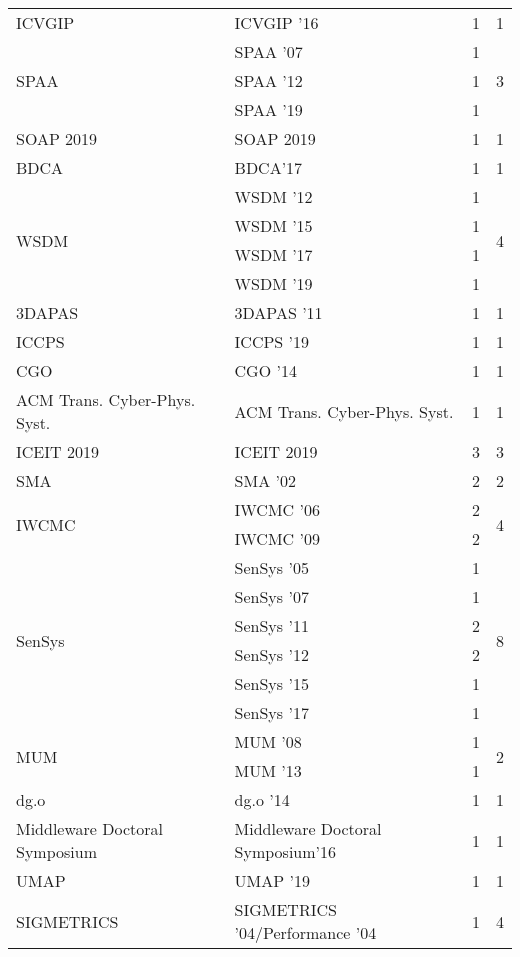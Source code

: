 \begin{table*}[t]
\begin{tabular}{llrr}
\multirow{1}{*}{ICVGIP } & ICVGIP '16 & 1 & \multirow{1}{*}{1}\\
\multirow{3}{*}{SPAA } & SPAA '07 & 1 & \multirow{3}{*}{3}\\
& SPAA '12 & 1 &\\
& SPAA '19 & 1 &\\
\multirow{1}{*}{SOAP 2019} & SOAP 2019 & 1 & \multirow{1}{*}{1}\\
\multirow{1}{*}{BDCA} & BDCA'17 & 1 & \multirow{1}{*}{1}\\
\multirow{4}{*}{WSDM } & WSDM '12 & 1 & \multirow{4}{*}{4}\\
& WSDM '15 & 1 &\\
& WSDM '17 & 1 &\\
& WSDM '19 & 1 &\\
\multirow{1}{*}{3DAPAS } & 3DAPAS '11 & 1 & \multirow{1}{*}{1}\\
\multirow{1}{*}{ICCPS } & ICCPS '19 & 1 & \multirow{1}{*}{1}\\
\multirow{1}{*}{CGO } & CGO '14 & 1 & \multirow{1}{*}{1}\\
\multirow{1}{*}{ACM Trans. Cyber-Phys. Syst.} & ACM Trans. Cyber-Phys. Syst. & 1 & \multirow{1}{*}{1}\\
\multirow{1}{*}{ICEIT 2019} & ICEIT 2019 & 3 & \multirow{1}{*}{3}\\
\multirow{1}{*}{SMA } & SMA '02 & 2 & \multirow{1}{*}{2}\\
\multirow{2}{*}{IWCMC } & IWCMC '06 & 2 & \multirow{2}{*}{4}\\
& IWCMC '09 & 2 &\\
\multirow{6}{*}{SenSys } & SenSys '05 & 1 & \multirow{6}{*}{8}\\
& SenSys '07 & 1 &\\
& SenSys '11 & 2 &\\
& SenSys '12 & 2 &\\
& SenSys '15 & 1 &\\
& SenSys '17 & 1 &\\
\multirow{2}{*}{MUM } & MUM '08 & 1 & \multirow{2}{*}{2}\\
& MUM '13 & 1 &\\
\multirow{1}{*}{dg.o } & dg.o '14 & 1 & \multirow{1}{*}{1}\\
\multirow{1}{*}{Middleware Doctoral Symposium} & Middleware Doctoral Symposium'16 & 1 & \multirow{1}{*}{1}\\
\multirow{1}{*}{UMAP } & UMAP '19 & 1 & \multirow{1}{*}{1}\\
\multirow{3}{*}{SIGMETRICS } & SIGMETRICS '04/Performance '04 & 1 & \multirow{3}{*}{4}\\

\end{tabular}
\end{table*}
